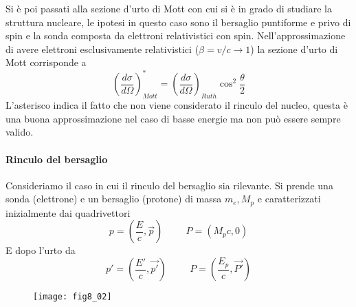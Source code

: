 Si è poi passati alla sezione d'urto di Mott con cui si è in grado di studiare la struttura nucleare, le ipotesi in questo caso sono il bersaglio puntiforme e privo di spin e la sonda composta da elettroni relativistici con spin.
Nell'approssimazione di avere elettroni esclusivamente relativistici ($\beta=v/c\to 1$) la sezione d'urto di Mott corrisponde a
\begin{equation}
\left(\frac{d\sigma}{d\Omega}\right)_{Mott}^*=\left(\frac{d\sigma}{d\Omega}\right)_{Ruth}\cos^2 \frac{\theta}{2}
\end{equation}
L'asterisco indica il fatto che non viene considerato il rinculo del nucleo, questa è una buona approssimazione nel caso di basse energie ma non può essere sempre valido.

\paragraph{Rinculo del bersaglio}
Consideriamo il caso in cui il rinculo del bersaglio sia rilevante.
Si prende una sonda (elettrone) e un bersaglio (protone) di massa $m_e, M_p$ e caratterizzati inizialmente dai quadrivettori
\begin{equation}
p=\left(\frac{E}{c}, \vec{p}\right)\hspace{1cm}P=(M_pc, 0)
\end{equation}
E dopo l'urto da
\begin{equation}
p'=\left(\frac{E'}{c}, \vec{p'}\right)\hspace{1cm} P=\left(\frac{E_p}{c}, \vec{P'}\right)
\end{equation}
\begin{figure}[h]
\centering
\texttt{[image: fig8\_02]}
\end{figure}

